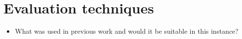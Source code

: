 \section{Evaluation techniques}
\begin{itemize}
	\item What was used in previous work and would it be suitable in this instance?
\end{itemize}
	
